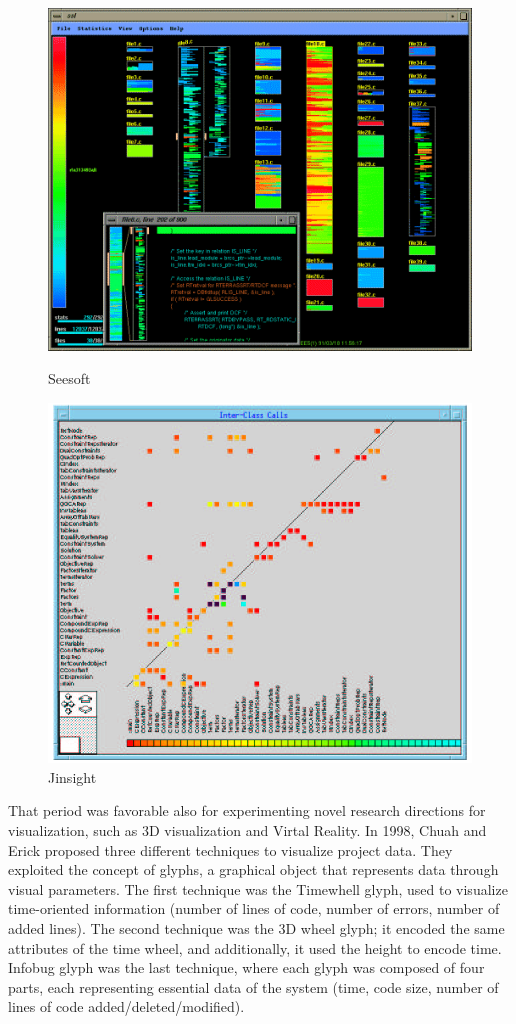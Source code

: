\begin{figure}[H]
    \includegraphics[width=0.8\linewidth]{Eick1992_Seesoft.png}
    \caption{Seesoft}
  \endminipage\hfill
    \includegraphics[width=0.8\linewidth]{DePauw1993_Jinsight.png}
    \caption{Jinsight}
  \endminipage\hfill
\end{figure}


That period was favorable also for experimenting novel research directions for visualization, 
such as 3D visualization and Virtal Reality. 
In 1998, Chuah and Erick \cite{Chuah1998} proposed three different techniques to visualize project data. 
They exploited the concept of glyphs, a graphical object that represents data through visual parameters. 
The first technique was the Timewhell glyph, used to visualize time-oriented information (number of lines of code, number of errors, number of added lines). 
The second technique was the 3D wheel glyph; it encoded the same attributes of the time wheel, and additionally, it used the height to encode time. 
Infobug glyph was the last technique, where each glyph was composed of four parts, each representing essential data of the system (time, code size, number of lines of code added/deleted/modified). \newline

